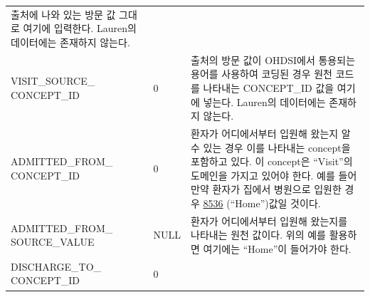 \documentclass[10.5pt]{book}
\theoremstyle{definition}
\theoremstyle{definition}
\theoremstyle{definition}
\theoremstyle{remark}
\begin{document}
\begin{longtable}[]{@{}lll@{}}
\begin{minipage}[t]{0.48\columnwidth}
출처에 나와 있는 방문 값 그대로 여기에 입력한다. Lauren의 데이터에는
존재하지 않는다.\strut
\end{minipage}\tabularnewline
\begin{minipage}[t]{0.28\columnwidth}\raggedright\strut
VISIT\_SOURCE\_ CONCEPT\_ID\strut
\end{minipage} & \begin{minipage}[t]{0.16\columnwidth}\raggedright\strut
0\strut
\end{minipage} & \begin{minipage}[t]{0.48\columnwidth}\raggedright\strut
출처의 방문 값이 OHDSI에서 통용되는 용어를 사용하여 코딩된 경우 원천
코드를 나타내는 CONCEPT\_ID 값을 여기에 넣는다. Lauren의 데이터에는
존재하지 않는다.\strut
\end{minipage}\tabularnewline
\begin{minipage}[t]{0.28\columnwidth}\raggedright\strut
ADMITTED\_FROM\_ CONCEPT\_ID\strut
\end{minipage} & \begin{minipage}[t]{0.16\columnwidth}\raggedright\strut
0\strut
\end{minipage} & \begin{minipage}[t]{0.48\columnwidth}\raggedright\strut
환자가 어디에서부터 입원해 왔는지 알 수 있는 경우 이를 나타내는
concept을 포함하고 있다. 이 concept은 ``Visit''의 도메인을 가지고 있어야
한다. 예를 들어 만약 환자가 집에서 병원으로 입원한 경우
\href{http://athena.ohdsi.org/search-terms/terms/8536}{8536}
(``Home'')값일 것이다.\strut
\end{minipage}\tabularnewline
\begin{minipage}[t]{0.28\columnwidth}\raggedright\strut
ADMITTED\_FROM\_ SOURCE\_VALUE\strut
\end{minipage} & \begin{minipage}[t]{0.16\columnwidth}\raggedright\strut
NULL\strut
\end{minipage} & \begin{minipage}[t]{0.48\columnwidth}\raggedright\strut
환자가 어디에서부터 입원해 왔는지를 나타내는 원천 값이다. 위의 예를
활용하면 여기에는 ``Home''이 들어가야 한다.\strut
\end{minipage}\tabularnewline
\begin{minipage}[t]{0.28\columnwidth}\raggedright\strut
DISCHARGE\_TO\_ CONCEPT\_ID\strut
\end{minipage} & \begin{minipage}[t]{0.16\columnwidth}\raggedright\strut
0\strut
\end{minipage} & \begin{minipage}[t]{0.48\columnwidth}\raggedright\strut

\end{minipage}
\end{longtable}
\end{document}
